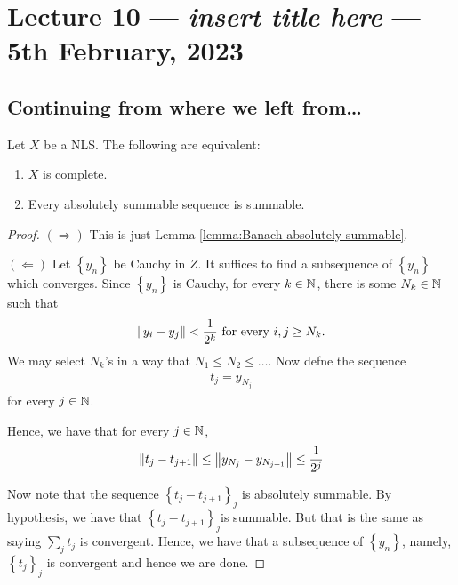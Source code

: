 \section{Lecture 10 --- \textit{insert title here} --- 5th February, 2023}
\horz
\subsection{Continuing from where we left from\ldots}


\begin{theorem}
    Let $X$ be a NLS. The following are equivalent:
    \begin{enumerate}
	\item $X$ is complete.
	\item Every absolutely summable sequence is summable.
    \end{enumerate}
    \label{thm:equivalent-thm-Banach}
\end{theorem}
\begin{proof}
    $\left( \Longrightarrow \right)$ This is just Lemma \ref{lemma:Banach-absolutely-summable}.

    $\left( \Longleftarrow \right)$ Let $\left\{ y_{n} \right\}$ be Cauchy in $Z$. It suffices to find a subsequence of $\left\{ y_{n} \right\}$ which converges. Since $\left\{ y_n \right\}$ is Cauchy, for every $k\in \mathbb N$, there is some $N_{k} \in \mathbb N$ such that 
    \begin{align*}
	\left\lVert y_{i} - y_{j} \right\rVert < \frac{1}{2^{k}} \text{ for every } i, j \ge N_{k}\text{.}
    \end{align*}
    We may select $N_{k}$'s in a way that $N_{1} \le N_{2} \le \ldots$. Now defne the sequence
    \begin{align*}
	t_{j} = y_{N_{j}}
    \end{align*}
    for every $j \in \mathbb N$.

    Hence, we have that for every $j \in \mathbb N$,
    \begin{align*}
    \left\lVert t_{j} - t_{j+1} \right\rVert \le \left\lVert y_{N_{j}} - y_{N_{j+1}} \right\rVert \le \frac{1}{2^{j}}
    \end{align*}
    
    Now note that the sequence $\left\{ t_{j} - t_{j+1} \right\}_{j}$ is absolutely summable. By hypothesis, we have that $\left\{ t_{j} - t_{j+1} \right\}_{j}$is summable. But that is the same as saying $\sum_{j} {t_j}$ is convergent. Hence, we have that a subsequence of $\left\{ y_{n} \right\}$, namely, $\left\{ t_{j} \right\}_{j}$ is convergent and hence we are done.
\end{proof}

